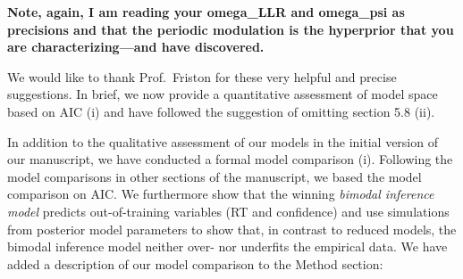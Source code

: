 \documentclass[
]{article}
\begin{document}
\textbf{Note, again, I am reading your omega\_LLR and omega\_psi as
precisions and that the periodic modulation is the hyperprior that you
are characterizing---and have discovered.}

We would like to thank Prof.~Friston for these very helpful and precise
suggestions. In brief, we now provide a quantitative assessment of model
space based on AIC (i) and have followed the suggestion of omitting
section 5.8 (ii).

In addition to the qualitative assessment of our models in the initial
version of our manuscript, we have conducted a formal model comparison
(i). Following the model comparisons in other sections of the
manuscript, we based the model comparison on AIC. We furthermore show
that the winning \emph{bimodal inference model} predicts out-of-training
variables (RT and confidence) and use simulations from posterior model
parameters to show that, in contrast to reduced models, the bimodal
inference model neither over- nor underfits the empirical data. We have
added a description of our model comparison to the Method section:
\end{document}
